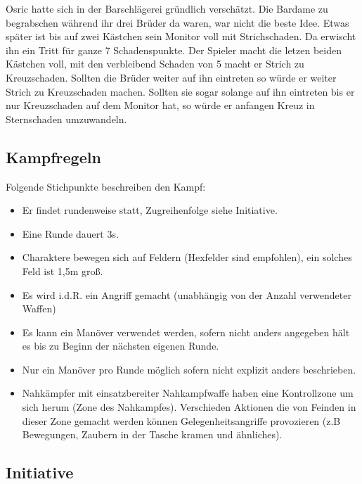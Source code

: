 \documentclass{article}
\begin{document}
Osric hatte sich in der Barschlägerei gründlich verschätzt. Die Bardame zu begrabschen während ihr drei Brüder da
waren, war nicht die beste Idee. Etwas später ist bis auf zwei Kästchen sein Monitor voll mit Strichschaden. Da
erwischt ihn ein Tritt für ganze 7 Schadenspunkte. Der Spieler macht die letzen beiden Kästchen voll, mit den
verbleibend Schaden von 5 macht er Strich zu Kreuzschaden. Sollten die Brüder weiter auf ihn eintreten so würde er
weiter Strich zu Kreuzschaden machen. Sollten sie sogar solange auf ihn eintreten bis er nur Kreuzschaden auf dem
Monitor hat, so würde er anfangen Kreuz in Sternschaden umzuwandeln.

\begin{center}
\subsection{Kampfregeln}
\end{center}

Folgende Stichpunkte beschreiben den Kampf:

\begin{itemize}
\item Er findet rundenweise statt, Zugreihenfolge siehe Initiative.
\item Eine Runde dauert 3s.
\item Charaktere bewegen sich auf Feldern (Hexfelder sind empfohlen), ein solches Feld ist 1,5m groß.
\item Es wird i.d.R. ein Angriff gemacht (unabhängig von der Anzahl verwendeter Waffen)
\item Es kann ein Manöver verwendet werden, sofern nicht anders angegeben hält es bis zu Beginn der nächsten eigenen Runde.
\item Nur ein Manöver pro Runde möglich sofern nicht explizit anders beschrieben.
\item Nahkämpfer mit einsatzbereiter Nahkampfwaffe haben eine Kontrollzone um sich herum (Zone des Nahkampfes). Verschieden Aktionen die von Feinden in dieser Zone gemacht werden können Gelegenheitsangriffe provozieren (z.B Bewegungen, Zaubern in der Tasche kramen und ähnliches).
\end{itemize}

\begin{center}
\subsection{Initiative}
\end{center}
\end{document}
